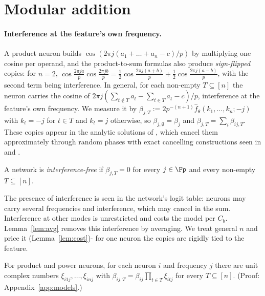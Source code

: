 \section{Modular addition}\label{sec:cyclic}


\paragraph{Interference at the feature's own frequency.}
A product neuron builds $\cos(2\pi j(a_1+\dots+a_n-c)/p)$ by multiplying one cosine per operand, and the product-to-sum formulas also produce \emph{sign-flipped} copies: for $n=2$, $\cos\frac{2\pi ja}p\cos\frac{2\pi jb}p=\frac12\cos\frac{2\pi j(a+b)}p+\frac12\cos\frac{2\pi j(a-b)}p$, with the second term being interference. In general, for each non-empty $T\subseteq[n]$ the neuron carries the cosine of $2\pi j(\sum_{t\notin T}a_t-\sum_{t\in T}a_t-c)/p$, interference at the feature's own frequency. We measure it by $\beta_{j,T}:=2p^{-(n+1)}\hat f_\theta(k_1,\dots,k_n;-j)$ with $k_t=-j$ for $t\in T$ and $k_t=j$ otherwise, so $\beta_{j,\emptyset}=\beta_j$ and $\beta_{j,T}=\sum_i\beta_{ij,T}$. These copies appear in the analytic solutions of \citet[Eqs.~10--11]{gromov2023grokking}, which cancel them approximately through random phases with exact cancelling constructions seen in \citet[App.~F.2]{morwani2024feature} and \citet[App.~E]{li2025nsum}.

\begin{definition}\label{def:if}
A network is \emph{interference-free} if $\beta_{j,T}=0$ for every $j\in\Fp$ and every non-empty $T\subseteq[n]$.
\end{definition}

The presence of interference is seen in the network's logit table: neurons may carry several frequencies and interference, which may cancel in the sum. Interference at other modes is unrestricted and costs the model per $C_b$. Lemma~\ref{lem:avg} removes this interference by averaging. We treat general $n$ and price it (Lemma~\ref{lem:cost})- for one neuron the copies are rigidly tied to the feature.

\begin{lemma}[]\label{lem:sign}
For product and power neurons, for each neuron $i$ and frequency $j$ there are unit complex numbers $\xi_{i1j},\dots,\xi_{inj}$ with $\beta_{ij,T}=\beta_{ij}\prod_{t\in T}\xi_{itj}$ for every $T\subseteq[n]$. (Proof: Appendix~\ref{app:models}.)
\end{lemma}


